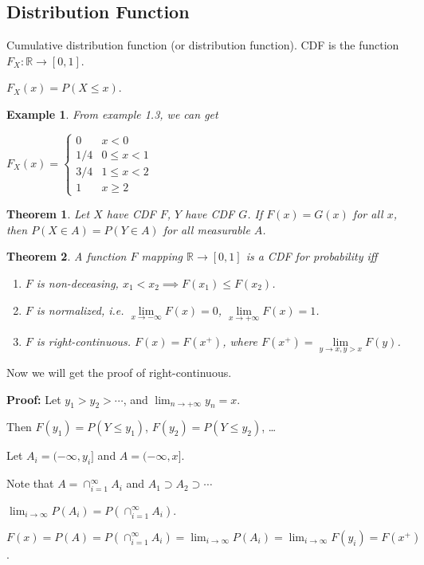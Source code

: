 \documentclass[11pt]{article}
\def\BR{{\mathbb R}}
\newtheorem{theorem}{Theorem}[section]
\newtheorem{example}{Example}[section]
\begin{document}
\subsection{Distribution Function}
Cumulative distribution function (or distribution function). CDF is the function $F_X : \BR \to [0, 1]$.

$F_X(x) = P(X \leq x)$.

\begin{example}
From example 1.3, we can get

$F_X(x) = \left\{\begin{array}{cc}
             0 & x < 0 \\
             1/4 & 0 \leq x < 1 \\
             3/4 & 1 \leq x < 2 \\
             1 & x \geq 2
           \end{array}
           \right.
$
\end{example}

\begin{theorem}
Let $X$ have CDF $F$, $Y$ have CDF $G$.
If $F(x) = G(x)$ for all $x$, then $P(X \in A) = P(Y \in A)$ for all measurable $A$.
\end{theorem}

\begin{theorem}
A function $F$ mapping $\BR \to [0, 1]$ is a CDF for probability iff
\begin{enumerate}
\item $F$ is non-deceasing, $x_1 < x_2 \implies F(x_1) \leq F(x_2)$.
\item $F$ is normalized, i.e. $\lim\limits_{x \to -\infty} F(x) = 0$, $\lim\limits_{x \to +\infty}F(x) = 1$.
\item $F$ is right-continuous. $F(x) = F(x^+)$, where $F(x^+) = \lim\limits_{y \to x, y > x} F(y)$.
\end{enumerate}
\end{theorem}

Now we will get the proof of right-continuous.

{\bf Proof: }
Let $y_1 > y_2 > \cdots$, and $\lim_{n \to +\infty} y_n = x$.

Then $F(y_1) = P(Y \leq y_1)$, $F(y_2) = P(Y \leq y_2)$, \dots

Let $A_i = (-\infty, y_i]$ and $A = (-\infty, x]$.

Note that $A = \cap_{i=1}^\infty A_i$ and $A_1 \supset A_2 \supset \cdots$

$\lim_{i \to \infty} P(A_i) = P(\cap_{i=1}^\infty A_i)$.

$F(x) = P(A) = P(\cap_{i=1}^\infty A_i) = \lim_{i\to\infty} P(A_i) = \lim_{i \to \infty} F(y_i) = F(x^+)$.
\end{document}
